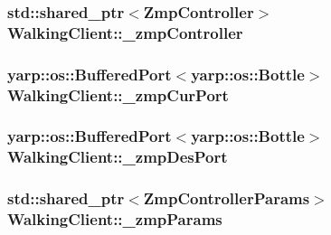 \hypertarget{classWalkingClient_afc6a0ac97a4c3f83e27879e803fab8f6}{
\subsubsection[{\-\_\-zmp\-Controller}]{\setlength{\rightskip}{0pt plus 5cm}std\-::shared\-\_\-ptr$<${\bf \-Zmp\-Controller}$>$ {\bf \-Walking\-Client\-::\-\_\-zmp\-Controller}}}\label{classWalkingClient_afc6a0ac97a4c3f83e27879e803fab8f6}
\hypertarget{classWalkingClient_a546e6830e43d19ba7d8a8e808e28ef53}{
\subsubsection[{\-\_\-zmp\-Cur\-Port}]{\setlength{\rightskip}{0pt plus 5cm}yarp\-::os\-::\-Buffered\-Port$<$yarp\-::os\-::\-Bottle$>$ {\bf \-Walking\-Client\-::\-\_\-zmp\-Cur\-Port}}}\label{classWalkingClient_a546e6830e43d19ba7d8a8e808e28ef53}
\hypertarget{classWalkingClient_acbac3e142471448b50dd605e4217b0d0}{
\subsubsection[{\-\_\-zmp\-Des\-Port}]{\setlength{\rightskip}{0pt plus 5cm}yarp\-::os\-::\-Buffered\-Port$<$yarp\-::os\-::\-Bottle$>$ {\bf \-Walking\-Client\-::\-\_\-zmp\-Des\-Port}}}\label{classWalkingClient_acbac3e142471448b50dd605e4217b0d0}
\hypertarget{classWalkingClient_a20012b4bee7f6de8177ed53907f894cb}{
\subsubsection[{\-\_\-zmp\-Params}]{\setlength{\rightskip}{0pt plus 5cm}std\-::shared\-\_\-ptr$<${\bf \-Zmp\-Controller\-Params}$>$ {\bf \-Walking\-Client\-::\-\_\-zmp\-Params}}}\label{classWalkingClient_a20012b4bee7f6de8177ed53907f894cb}
